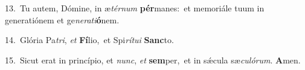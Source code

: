 {\numbfont\textcolor{\numbcolor}{13.}}~Tu autem, Dómine, in æ\-\textit{tér}\-\textit{num} \textbf{pér}\-manes:~\star et memoriále tuum in generatiónem et ge\-\textit{ne}\-\textit{ra}\textit{ti}\textbf{ó}nem.\par
{\numbfont\textcolor{\numbcolor}{14.}}~Glória Pa\-\textit{tri}\-, \textit{et} \textbf{Fí}\-lio,~\star et Spi\-\textit{rí}\-\textit{tu}\textit{i} \textbf{Sanc}\-to.\par
{\numbfont\textcolor{\numbcolor}{15.}}~Sicut erat in princípio, et \textit{nunc}\-, \textit{et} \textbf{sem}\-per,~\star et in sǽcula sæ\-\textit{cu}\-\textit{ló}\textit{rum}. \textbf{A}\-men.\par
